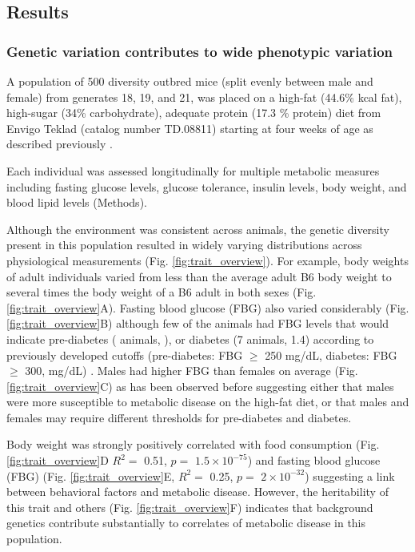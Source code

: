 \documentclass[
]{article}
\begin{document}
\subsection{Results}\label{results}

\subsubsection{Genetic variation contributes to wide phenotypic
variation}\label{genetic-variation-contributes-to-wide-phenotypic-variation}

A population of 500 diversity outbred mice (split evenly between male
and female) from generates 18, 19, and 21, was placed on a high-fat
(44.6\% kcal fat), high-sugar (34\% carbohydrate), adequate protein
(17.3 \% protein) diet from Envigo Teklad (catalog number TD.08811)
starting at four weeks of age as described previously
\cite{pmid29567659}.

Each individual was assessed longitudinally for multiple metabolic
measures including fasting glucose levels, glucose tolerance, insulin
levels, body weight, and blood lipid levels (Methods).

Although the environment was consistent across animals, the genetic
diversity present in this population resulted in widely varying
distributions across physiological measurements (Fig.
\ref{fig:trait_overview}). For example, body weights of adult
individuals varied from less than the average adult B6 body weight to
several times the body weight of a B6 adult in both sexes (Fig.
\ref{fig:trait_overview}A). Fasting blood glucose (FBG) also varied
considerably (Fig. \ref{fig:trait_overview}B) although few of the
animals had FBG levels that would indicate pre-diabetes ( animals, ), or
diabetes (7 animals, 1.4) according to previously developed cutoffs
(pre-diabetes: FBG \(\geq\) 250 mg/dL, diabetes: FBG \(\geq\) 300,
mg/dL) \cite{pmid17018838}. Males had higher FBG than females on average
(Fig. \ref{fig:trait_overview}C) as has been observed before suggesting
either that males were more susceptible to metabolic disease on the
high-fat diet, or that males and females may require different
thresholds for pre-diabetes and diabetes.

Body weight was strongly positively correlated with food consumption
(Fig. \ref{fig:trait_overview}D \(R^2 =\) 0.51, \(p=\)
\ensuremath{1.5\times 10^{-75}}) and fasting blood glucose (FBG) (Fig.
\ref{fig:trait_overview}E, \(R^2=\) 0.25, \(p =\)
\ensuremath{2\times 10^{-32}}) suggesting a link between behavioral
factors and metabolic disease. However, the heritability of this trait
and others (Fig. \ref{fig:trait_overview}F) indicates that background
genetics contribute substantially to correlates of metabolic disease in
this population.
\end{document}
